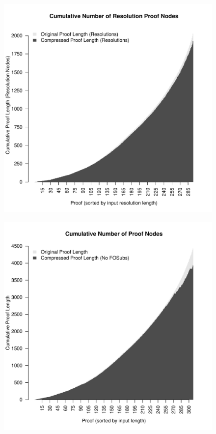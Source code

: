 \begin{figure}
\includegraphics[scale=0.5]{images/cumulative_res_nodes.pdf}
\end{figure}

\begin{figure}
\includegraphics[scale=0.5]{images/cumulative_res_nodes_no_subs.pdf}
\end{figure}

